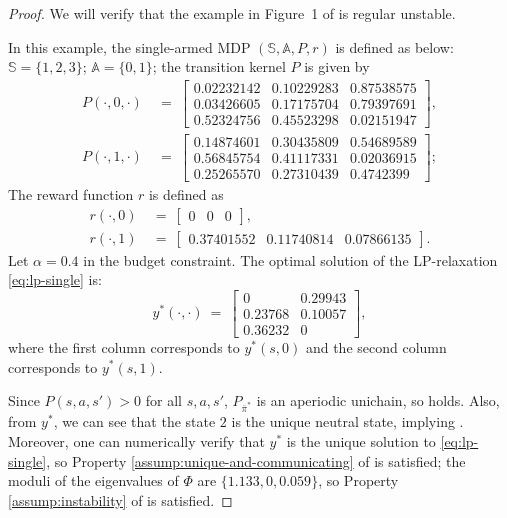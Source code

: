 \documentclass[11pt,letterpaper]{article}
\theoremstyle{plain}
\theoremstyle{definition}
\theoremstyle{remark}
\newcommand{\sspa}{\mathbb{S}}
\newcommand{\aspa}{\mathbb{A}}
\newcommand{\pibar}{{\sysbar{\pi}}}
\newcommand{\pibs}{{\pibar^*}}
\newcommand{\sysbar}[1]{\bar{#1}}
\begin{document}
\begin{proof}
    We will verify that the example in Figure~1 of \cite{HonXieCheWan_23} is regular unstable. 
    
    In this example, the single-armed MDP $(\sspa, \aspa, P, r)$ is defined as below: $\sspa = \{1,2,3\}$; $\aspa=\{0,1\}$; the transition kernel $P$ is given by 
    \begin{align*}
    P( \cdot ,0,\cdot ) \ &=\ \begin{bmatrix}
    0.02232142 & 0.10229283 & 0.87538575\\
    0.03426605 & 0.17175704 & 0.79397691\\
    0.52324756 & 0.45523298 & 0.02151947
    \end{bmatrix}, \\
    P( \cdot ,1,\cdot ) \ &=\ \begin{bmatrix}
    0.14874601 & 0.30435809 & 0.54689589\\
    0.56845754 & 0.41117331 & 0.02036915\\
    0.25265570 & 0.27310439 & 0.4742399
    \end{bmatrix};
    \end{align*}
    The reward function $r$ is defined as
    \begin{align*}
        r( \cdot , 0) \ &=
        \ \begin{bmatrix}
            0 & 0 & 0
            \end{bmatrix}, \\
        r( \cdot , 1) \ &=
        \ \begin{bmatrix}
            0.37401552 & 0.11740814 & 0.07866135
            \end{bmatrix}.
    \end{align*}
    Let $\alpha = 0.4$ in the budget constraint. 
    The optimal solution of the LP-relaxation \eqref{eq:lp-single} is:
    \[
        y^*( \cdot ,\cdot ) \ =\ \begin{bmatrix}
            0 & 0.29943\\
            0.23768 & 0.10057\\
            0.36232 & 0
            \end{bmatrix},
    \]
    where the first column corresponds to $y^*(s,0)$ and the second column corresponds to $y^*(s, 1)$. 
    
    Since $P(s,a,s')> 0$ for all $s,a,s'$, $P_\pibs$ is an aperiodic unichain, so  holds. Also, from $y^*$, we can see that the state $2$ is the unique neutral state, implying . 
    Moreover, one can numerically verify that $y^*$ is the unique solution to \eqref{eq:lp-single}, so Property \ref{assump:unique-and-communicating} of  is satisfied; 
    the moduli of the eigenvalues of $\Phi$ are $\{1.133, 0, 0.059\}$, so Property \ref{assump:instability} of  is satisfied. 
    

\end{proof}
\end{document}
